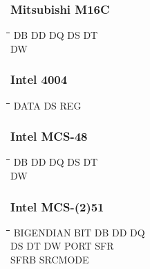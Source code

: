 \subsubsection{Mitsubishi M16C}
{\tt\begin{tabbing}
\hspace{3cm}\=\hspace{3cm}\=\hspace{3cm}\=\hspace{3cm}\=\kill
DB         \> DD          \> DQ          \> DS          \> DT \\
DW \\
\end{tabbing}}

\subsubsection{Intel 4004}
{\tt\begin{tabbing}
\hspace{3cm}\=\hspace{3cm}\=\hspace{3cm}\=\hspace{3cm}\=\kill   
DATA       \> DS          \> REG \\
\end{tabbing}}

\subsubsection{Intel MCS-48}
{\tt\begin{tabbing}
\hspace{3cm}\=\hspace{3cm}\=\hspace{3cm}\=\hspace{3cm}\=\kill
DB         \> DD          \> DQ          \> DS          \> DT \\
DW \\
\end{tabbing}}

\subsubsection{Intel MCS-(2)51}
{\tt\begin{tabbing}
\hspace{3cm}\=\hspace{3cm}\=\hspace{3cm}\=\hspace{3cm}\=\kill
BIGENDIAN  \> BIT         \> DB          \> DD          \> DQ \\
DS         \> DT          \> DW          \> PORT        \> SFR \\
SFRB       \> SRCMODE \\
\end{tabbing}}

